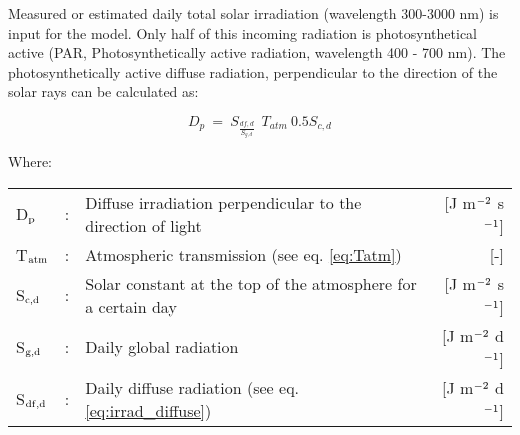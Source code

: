Measured or estimated daily total solar irradiation (wavelength 300-3000 nm) is input for
the model. Only half of this incoming radiation is photosynthetical active (PAR,
Photosynthetically active radiation, wavelength 400 - 700 nm). The photosynthetically active
diffuse radiation, perpendicular to the direction of the solar rays can be calculated as:

\begin{equation}
\label{eq:PAR}
D _{p} ~=~ S _{\frac{df,d}{S _{g,d} }} ~~ T _{atm} ~0.5S _{c,d} 
\end{equation}


Where:\\[5pt]
\begin{tabularx}{\textwidth}{llXr}
	D$_{{\rm p}}$ &:& Diffuse irradiation perpendicular to the direction of light  & 
	[J m$^{{\rm -2}}$ s$^{{\rm -1}}$]\\
	T$_{{\rm atm}}$ &:& Atmospheric transmission (see eq. \ref{eq:Tatm})  & [-]\\
	S$_{{\rm c,d}}$ &:& Solar constant at the top of the atmosphere for a certain day  & 
	[J m$^{{\rm -2}}$ s$^{{\rm -1}}$]\\
	S$_{{\rm g,d}}$ &:& Daily global radiation  & [J m$^{{\rm -2}}$ d$^{{\rm -1}}$]\\
	S$_{{\rm df,d}}$ &:& Daily diffuse radiation (see eq. \ref{eq:irrad_diffuse})  & 
	[J m$^{{\rm -2}}$ d$^{{\rm -1}}$]\\
\end{tabularx}


